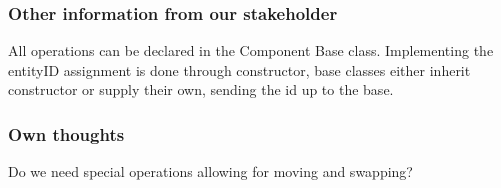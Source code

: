 \documentclass{article}
\begin{document}
\subsubsection*{Other information from our stakeholder}
All operations can be declared in the Component Base class.
Implementing the entityID assignment is done through constructor, base classes either inherit constructor or supply their own, sending the id up to the base.

\subsubsection*{Own thoughts}
Do we need special operations allowing for moving and swapping?
\end{document}
